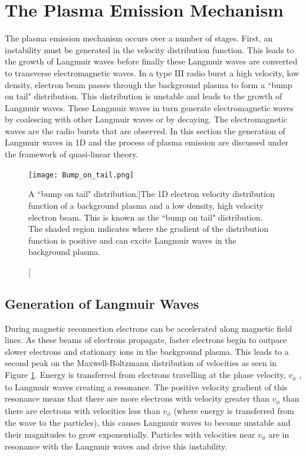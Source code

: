 \section{The Plasma Emission Mechanism}
\label{sec:plasma_emission}
The plasma emission mechanism occurs over a number of stages. First, an instability must be generated in the velocity distribution function. This leads to the growth of Langmuir waves before finally these Langmuir waves are converted to transverse electromagnetic waves. In a type III radio burst a high velocity, low density, electron beam passes through the background plasma to form a ``bump on tail" distribution. This distribution is unstable and leads to the growth of Langmuir waves. These Langmuir waves in turn generate electromagnetic waves by coalescing with other Langmuir waves or by decaying. The electromagnetic waves are the radio bursts that are observed. In this section the generation of Langmuir waves in 1D and the process of plasma emission are discussed under the framework of quasi-linear theory.

\begin{figure}[ht]
\centering
\texttt{[image: Bump\_on\_tail.png]}
\caption[A ``bump on tail" distribution.]{The 1D electron velocity distribution function of a background plasma and a low density, high velocity electron beam. This is known as the ``bump on tail" distribution. The shaded region indicates where the gradient of the distribution function is positive and can excite Langmuir waves in the background plasma.}
\label{fig:bumpontail}
\end{figure}

\subsection{Generation of Langmuir Waves}
During magnetic reconnection electrons can be accelerated along magnetic field lines. As these beams of electrons propagate, faster electrons begin to outpace slower electrons and stationary ions in the background plasma. This leads to a second peak on the Maxwell-Boltzmann distribution of velocities as seen in Figure \ref{fig:bumpontail}. Energy is transferred from electrons travelling at the phase velocity, $v_{\phi}$ , to Langmuir waves creating a resonance.
The positive velocity gradient of this resonance means that there are more electrons with velocity greater than $v_{\phi}$ than there are electrons with velocities less than  $v_{\phi}$ (where energy is transferred from the wave to the particles), this causes Langmuir waves to become unstable and their magnitudes to grow exponentially. Particles with velocities near $v_{\phi}$ are in resonance with the Langmuir waves and drive this instability.

